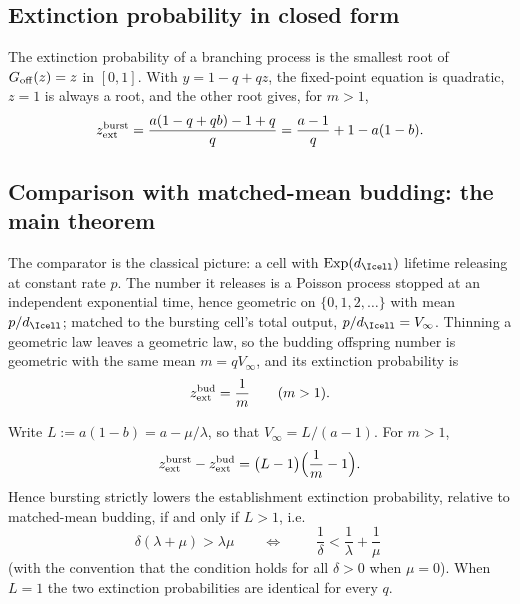 \subsection{Extinction probability in closed form}

The extinction probability of a branching process is the smallest root of
$G_{\rm off}(z)=z$ in $[0,1]$. With $y=1-q+qz$, the fixed-point equation is
quadratic, $z=1$ is always a root, and the other root gives, for $m>1$,
\begin{equation}
z_{\rm ext}^{\rm burst}
=\frac{a(1-q+qb)-1+q}{q}
=\frac{a-1}{q}+1-a(1-b).
\label{eq:zext}
\end{equation}

\subsection{Comparison with matched-mean budding: the main theorem}

The comparator is the classical picture: a cell with $\mathrm{Exp}(d_{\Icell})$
lifetime releasing at constant rate $p$. The number it releases is a Poisson
process stopped at an independent exponential time, hence geometric on
$\{0,1,2,\ldots\}$ with mean $p/d_{\Icell}$; matched to the bursting cell's
total output, $p/d_{\Icell}=V_\infty$. Thinning a geometric law leaves a
geometric law, so the budding offspring number is geometric with the same
mean $m=qV_\infty$, and its extinction probability is
\begin{equation}
z_{\rm ext}^{\rm bud}=\frac{1}{m}\qquad(m>1).
\end{equation}

\begin{theorem}
\label{thm:flood}
Write $L:=a(1-b)=a-\mu/\lambda$, so that $V_\infty=L/(a-1)$. For $m>1$,
\begin{equation}
z_{\rm ext}^{\rm burst}-z_{\rm ext}^{\rm bud}
=\bigl(L-1\bigr)\Bigl(\frac{1}{m}-1\Bigr).
\label{eq:flood}
\end{equation}
Hence bursting strictly lowers the establishment extinction probability,
relative to matched-mean budding, if and only if $L>1$, i.e.
\begin{equation}
\delta(\lambda+\mu)>\lambda\mu
\qquad\Longleftrightarrow\qquad
\boxed{\;\frac{1}{\delta}<\frac{1}{\lambda}+\frac{1}{\mu}\;}
\end{equation}
(with the convention that the condition holds for all $\delta>0$ when
$\mu=0$). When $L=1$ the two extinction probabilities are identical for
every $q$.
\end{theorem}

